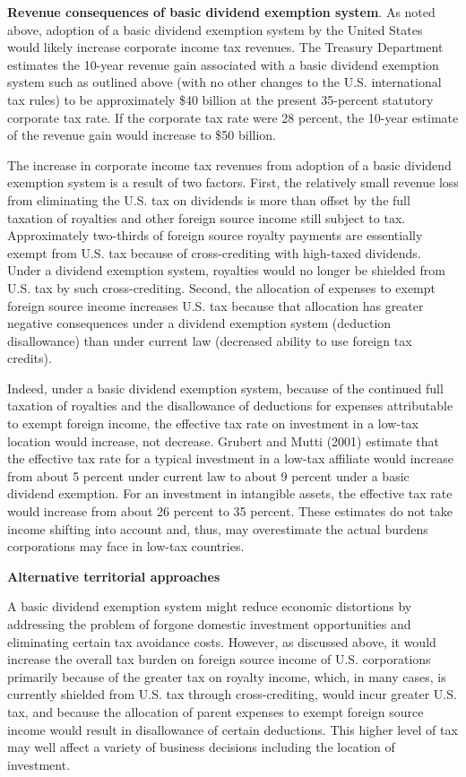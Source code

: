 \begin{select}
\textbf{Revenue consequences of basic dividend exemption system}.  As noted above, adoption of 
a basic dividend exemption system by the United States would likely increase corporate 
income tax revenues.  The Treasury Department estimates the 10-year revenue gain 
associated with a basic dividend exemption system such as outlined above (with no other 
changes to the U.S. international tax rules) to be approximately \$40 billion at the present 
35-percent statutory corporate tax rate.  If the corporate tax rate were 28 percent, the 10-year estimate of the revenue gain would increase to \$50 billion.
 
The increase in corporate income tax revenues from adoption of a basic dividend 
exemption system is a result of two factors.  First, the relatively small revenue loss from 
eliminating the U.S. tax on dividends is more than offset by the full taxation of royalties 
and other foreign source income still subject to tax.  Approximately two-thirds of foreign 
source royalty payments are essentially exempt from U.S. tax because of cross-crediting 
with high-taxed dividends.  Under a dividend exemption system, royalties would no 
longer be shielded from U.S. tax by such cross-crediting.  Second, the allocation of 
expenses to exempt foreign source income increases U.S. tax because that allocation has 
greater negative consequences under a dividend exemption system (deduction 
disallowance) than under current law (decreased ability to use foreign tax credits).  
 
Indeed, under a basic dividend exemption system, because of the continued full 
taxation of royalties and the disallowance of deductions for expenses attributable to 
exempt foreign income, the effective tax rate on investment in a low-tax location would 
increase, not decrease.  Grubert and Mutti (2001) estimate that the effective tax rate for a 
typical investment in a low-tax affiliate would increase from about 5 percent under 
current law to about 9 percent under a basic dividend exemption.  For an investment in 
intangible assets, the effective tax rate would increase from about 26 percent to 35 
percent.  These estimates do not take income shifting into account and, thus, may 
overestimate the actual burdens corporations may face in low-tax countries. 

\begin{center} 
\textbf{Alternative territorial approaches} 
\end{center}
 
A basic dividend exemption system might reduce economic distortions by 
addressing the problem of forgone domestic investment opportunities and eliminating 
certain tax avoidance costs.  However, as discussed above, it would increase the overall 
tax burden on foreign source income of U.S. corporations primarily because of the 
greater tax on royalty income, which, in many cases, is currently shielded from U.S. tax 
through cross-crediting, would incur greater U.S. tax, and because the allocation of parent 
expenses to exempt foreign source income would result in disallowance of certain 
deductions.  This higher level of tax may well affect a variety of business decisions 
including the location of investment.    
 

\end{select}
